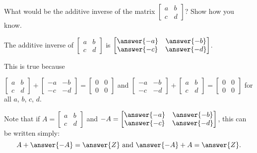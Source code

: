 \documentclass[space,nooutcomes]{ximera}
\begin{document}
\begin{question}
What would be the additive inverse of the matrix 
$\begin{bmatrix} a&b \\ c&d \end{bmatrix}$?  
Show how you know.  
\begin{solution}
The additive inverse of $\begin{bmatrix} a&b \\ c&d \end{bmatrix}$ is 
$\begin{bmatrix} \answer{-a}&\answer{-b} \\ \answer{-c}&\answer{-d} \end{bmatrix}$.  

\begin{question}
This is true because 

$\begin{bmatrix} a&b \\ c&d \end{bmatrix} + \begin{bmatrix} -a&-b \\ -c&-d \end{bmatrix} = 
\begin{bmatrix} 0&0 \\ 0&0 \end{bmatrix}$ 
and
$\begin{bmatrix} -a&-b \\ -c&-d \end{bmatrix} + \begin{bmatrix} a&b \\ c&d \end{bmatrix} = 
\begin{bmatrix} 0&0 \\ 0&0 \end{bmatrix}$ for all $a$, $b$, $c$, $d$. 

Note that if $A = \begin{bmatrix} a&b \\ c&d \end{bmatrix}$ and $-A = \begin{bmatrix} \answer{-a}&\answer{-b} \\ \answer{-c}&\answer{-d} \end{bmatrix}$, this can be written simply:  
\[
A + \answer{-A} = \answer{Z}\text{ and }\answer{-A} + A = \answer{Z}. 
\]
\end{question}
\end{solution}
\end{question}
\end{document}
